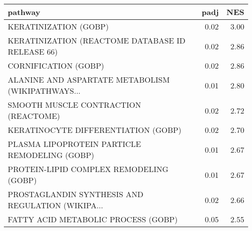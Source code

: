 \begin{tabular}{lrr}
\toprule
                                           pathway &  padj &   NES \\
\midrule
                             KERATINIZATION (GOBP) &  0.02 &  3.00 \\
  KERATINIZATION (REACTOME DATABASE ID RELEASE 66) &  0.02 &  2.86 \\
                              CORNIFICATION (GOBP) &  0.02 &  2.86 \\
 ALANINE AND ASPARTATE METABOLISM (WIKIPATHWAYS... &  0.01 &  2.80 \\
              SMOOTH MUSCLE CONTRACTION (REACTOME) &  0.02 &  2.72 \\
               KERATINOCYTE DIFFERENTIATION (GOBP) &  0.02 &  2.70 \\
     PLASMA LIPOPROTEIN PARTICLE REMODELING (GOBP) &  0.01 &  2.67 \\
           PROTEIN-LIPID COMPLEX REMODELING (GOBP) &  0.01 &  2.67 \\
 PROSTAGLANDIN SYNTHESIS AND REGULATION (WIKIPA... &  0.02 &  2.66 \\
               FATTY ACID METABOLIC PROCESS (GOBP) &  0.05 &  2.55 \\
\bottomrule
\end{tabular}
